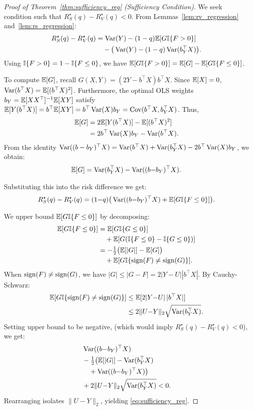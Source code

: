 \begin{proof}[Proof of Theorem~\ref{thm:sufficiency_reg} (Sufficiency Condition)]
We seek condition such that $R_S^\star(q) - R_V^\star(q) < 0$. From Lemmas~\ref{lem:rv_regression} and~\ref{lem:rs_regression}:
\begin{align*}
  R_S^\star(q) - R_V^\star(q) &= \operatorname{Var}(Y) - (1-q)\mathbb{E}[G\mathbb{I}\{F > 0\}] \\
  &\quad - \big(\operatorname{Var}(Y) - (1-q)\operatorname{Var}(b_Y^\top X)\big).
\end{align*}
Using $\mathbb{I}\{F > 0\} = 1 - \mathbb{I}\{F \le 0\}$, we have $\mathbb{E}[G\mathbb{I}\{F > 0\}] = \mathbb{E}[G] - \mathbb{E}[G\mathbb{I}\{F \le 0\}]$.

To compute $\mathbb{E}[G]$, recall $G(X,Y) = (2Y - b^\top X)b^\top X$. Since $\mathbb{E}[X]=0$, $\operatorname{Var}(b^\top X) = \mathbb{E}[(b^\top X)^2]$. Furthermore, the optimal OLS weights $b_Y = \mathbb{E}[XX^\top]^{-1}\mathbb{E}[XY]$ satisfy $\mathbb{E}[Y(b^\top X)] = b^\top \mathbb{E}[XY] = b^\top \operatorname{Var}(X)b_Y = \operatorname{Cov}(b^\top X, b_Y^\top X)$. Thus,
\begin{align*}
  \mathbb{E}[G] &= 2\mathbb{E}[Y(b^\top X)] - \mathbb{E}[(b^\top X)^2] \\
  &= 2b^\top \operatorname{Var}(X)b_Y - \operatorname{Var}(b^\top X).
\end{align*}
From the identity $\operatorname{Var}((b-b_Y)^\top X) = \operatorname{Var}(b^\top X) + \operatorname{Var}(b_Y^\top X) - 2b^\top \operatorname{Var}(X)b_Y$, we obtain:
\begin{equation*}
  \mathbb{E}[G] = \operatorname{Var}(b_Y^\top X) - \operatorname{Var}((b{-}b_Y)^\top X).
\end{equation*}

Substituting this into the risk difference we get:
\begin{equation*}
  R_S^\star(q) - R_V^\star(q) = (1{-}q)\big( \operatorname{Var}((b{-}b_Y)^\top X) + \mathbb{E}[G\mathbb{I}\{F \le 0\}] \big).
\end{equation*}

We upper bound $\mathbb{E}[G\mathbb{I}\{F \le 0\}]$ by decomposing:
\begin{align*}
  \mathbb{E}[G\mathbb{I}\{F \le 0\}] &= \mathbb{E}[G\mathbb{I}\{G \le 0\}] \\
  &\quad + \mathbb{E}[G(\mathbb{I}\{F \le 0\} - \mathbb{I}\{G \le 0\})] \\
  &= -\tfrac{1}{2}\big(\mathbb{E}[|G|] - \mathbb{E}[G]\big) \\
  &\quad + \mathbb{E}[G \mathbb{I}\{\operatorname{sign}(F) \neq \operatorname{sign}(G)\}].
\end{align*}
When $\operatorname{sign}(F) \neq \operatorname{sign}(G)$, we have $|G| \le |G - F|= 2|Y{-}U||b^\top X|$. By Cauchy-Schwarz:
\begin{align*}
  \mathbb{E}[G \mathbb{I}\{\operatorname{sign}(F) \neq \operatorname{sign}(G)\}] &\le \mathbb{E}[2|Y{-}U|\,|b^\top X|] \\
  &\le 2\|U{-}Y\|_2 \sqrt{\operatorname{Var}(b_Y^\top X)}.
\end{align*}
Setting upper bound to be negative, (which would imply $R_S^\star(q) - R_V^\star(q) <0$), we get:
\begin{align*}
  &\operatorname{Var}((b{-}b_Y)^\top X) \\
  &- \tfrac{1}{2}\big( \mathbb{E}[|G|] - \operatorname{Var}(b_Y^\top X) \\
  &\quad + \operatorname{Var}((b{-}b_Y)^\top X) \big) \\
  &+ 2\|U{-}Y\|_2\sqrt{\operatorname{Var}(b_Y^\top X)} < 0.
\end{align*}
Rearranging isolates $\|U{-}Y\|_2$, yielding \eqref{eq:sufficiency_reg}.
\end{proof}

